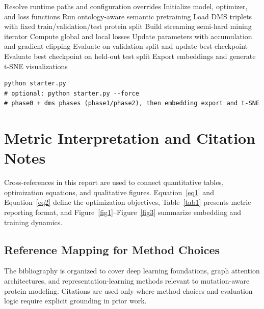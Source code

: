 \documentclass[unnumsec,webpdf,contemporary,large]{oup-authoring-template}%
\theoremstyle{thmstyleone}%
\theoremstyle{thmstyletwo}%
\theoremstyle{thmstylethree}%
\begin{document}
\begin{algorithm}[!t]
\caption{ContVAR training and export workflow}\label{algo1}
\begin{algorithmic}[1]
\State Resolve runtime paths and configuration overrides
\State Initialize model, optimizer, and loss functions
        \State Run ontology-aware semantic pretraining
\EndIf
\State Load DMS triplets with fixed train/validation/test protein split
        \State Build streaming semi-hard mining iterator
        \State Compute global and local losses
        \State Update parameters with accumulation and gradient clipping
        \State Evaluate on validation split and update best checkpoint
\EndFor
\State Evaluate best checkpoint on held-out test split
\State Export embeddings and generate t-SNE visualizations
\end{algorithmic}
\end{algorithm}

\begin{minipage}{\hsize}%
\lstset{language=Python}
\begin{lstlisting}[frame=single,framexleftmargin=-1pt,framexrightmargin=-17pt,framesep=12pt,linewidth=0.98\textwidth]
python starter.py
# optional: python starter.py --force
# phase0 + dms phases (phase1/phase2), then embedding export and t-SNE
\end{lstlisting}
\end{minipage}


\section{Metric Interpretation and Citation Notes}\label{sec8}

Cross-references in this report are used to connect quantitative tables, optimization equations, and qualitative figures. Equation~\ref{eq1} and Equation~\ref{eq2} define the optimization objectives, Table~\ref{tab1} presents metric reporting format, and Figure~\ref{fig1}--Figure~\ref{fig3} summarize embedding and training dynamics.

\subsection{Reference Mapping for Method Choices}\label{subsec3}

The bibliography is organized to cover deep learning foundations, graph attention architectures, and representation-learning methods relevant to mutation-aware protein modeling. Citations are used only where method choices and evaluation logic require explicit grounding in prior work.
\end{document}
